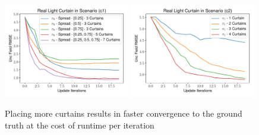 \begin{figure}[h]
    \centering
    \begin{minipage}{0.5\textwidth}
        \centering
        \includegraphics[width=0.49\textwidth]{figures/Figure_3.pdf}
        \includegraphics[width=0.49\textwidth]{figures/Figure_4.pdf}
    \end{minipage}\hfill
    \centering
    \caption{Placing more curtains results in faster convergence to the ground truth at the cost of runtime per iteration}
    \label{fig:figure34}
\end{figure}


